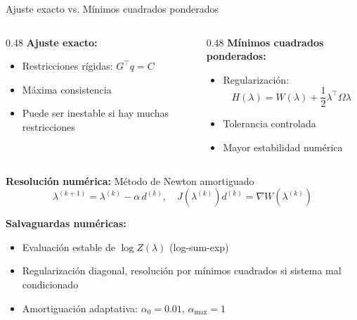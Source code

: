 \documentclass[8pt]{beamer}
\begin{document}
\begin{frame}{Ajuste exacto vs. Mínimos cuadrados ponderados}
    \begin{columns}[T]
    \begin{column}{0.48\textwidth}
    \textbf{Ajuste exacto:}
    \begin{itemize}
        \item Restricciones rígidas: $G^\top q = C$
        \item Máxima consistencia
        \item Puede ser inestable si hay muchas restricciones
    \end{itemize}
    \end{column}
    \begin{column}{0.48\textwidth}
    \textbf{Mínimos cuadrados ponderados:}
    \begin{itemize}
        \item Regularización:
        \[
            H(\lambda) = W(\lambda) + \frac{1}{2}\lambda^\top\Omega\lambda
        \]
        \item Tolerancia controlada
        \item Mayor estabilidad numérica
    \end{itemize}
    \end{column}
    \end{columns}
    \pause
    
    \vspace{0.4cm}
    \textbf{Resolución numérica:} Método de Newton amortiguado
    \[
        \lambda^{(k+1)} = \lambda^{(k)} - \alpha\, d^{(k)}, \quad J(\lambda^{(k)})d^{(k)} = \nabla W(\lambda^{(k)})
    \]
    \pause
    
    \vspace{0.2cm}
    \textbf{Salvaguardas numéricas:}
    \begin{itemize}
        \item Evaluación estable de $\log Z(\lambda)$ (log-sum-exp)
        \item Regularización diagonal, resolución por mínimos cuadrados si sistema mal condicionado
        \item Amortiguación adaptativa: $\alpha_0 = 0.01$, $\alpha_{\max} = 1$
    \end{itemize}
\end{frame}


\end{document}
